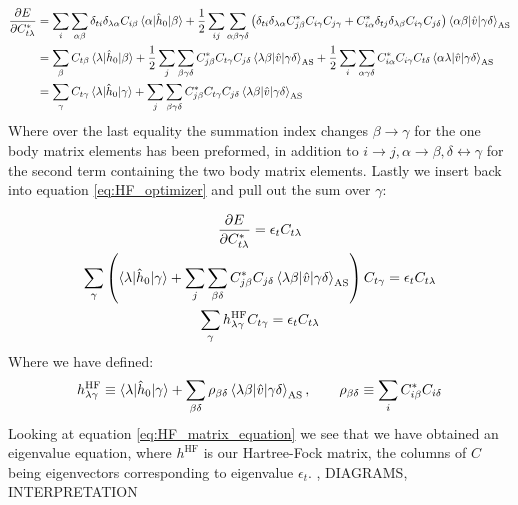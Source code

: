 \documentclass{article}
\newcommand{\inner}[3]{\braket{#1|#2|#3}}
\newcommand{\innerAS}[3]{\inner{#1}{#2}{#3}_{\text{AS}}}
\newcommand{\hnull}{\hat{h}_0}
\newcommand{\hafo}[1]{#1^{\text{HF}}}
\begin{document}
    \begin{align*}
        \pdv{E}{C^*_{t\lambda}} &= \sum_{i}\sum_{\alpha\beta} \delta_{ti}\delta_{\lambda\alpha} C_{i\beta} \inner{\alpha}{\hnull}{\beta} + \frac{1}{2}\sum_{ij}\sum_{\alpha\beta\gamma\delta} \left( \delta_{ti}\delta_{\lambda\alpha}C^*_{j\beta}C_{i\gamma}C_{j\gamma} + C^*_{i\alpha} \delta_{tj}\delta_{\lambda\beta} C_{i\gamma}C_{j\delta} \right) \innerAS{\alpha\beta}{\hat{v}}{\gamma\delta} \\
        &= \sum_{\beta} C_{t\beta} \inner{\lambda}{\hnull}{\beta} + \frac{1}{2}\sum_j \sum_{\beta\gamma\delta} C^*_{j\beta} C_{t\gamma} C_{j\delta} \innerAS{\lambda\beta}{\hat{v}}{\gamma\delta} + \frac{1}{2} \sum_i \sum_{\alpha\gamma\delta} C^*_{i\alpha} C_{i\gamma} C_{t\delta} \innerAS{\alpha\lambda}{\hat{v}}{\gamma\delta} \\
        &= \sum_\gamma C_{t\gamma} \inner{\lambda}{\hnull}{\gamma} + \sum_j \sum_{\beta\gamma\delta} C^*_{j\beta} C_{t\gamma} C_{j\delta} \innerAS{\lambda\beta}{\hat{v}}{\gamma\delta}
    \end{align*}
    Where over the last equality the summation index changes $\beta \rightarrow \gamma$ for the one body matrix elements has been preformed, in addition to $i \rightarrow j, \alpha \rightarrow \beta, \delta \leftrightarrow \gamma$ for the second term containing the two body matrix elements. Lastly we insert back into equation \eqref{eq:HF_optimizer} and pull out the sum over $\gamma$:

    \begin{gather}
        \pdv{E}{C^*_{t\lambda}} = \epsilon_t C_{t\lambda} \nonumber \\
        \sum_\gamma \left(\inner{\lambda}{\hnull}{\gamma} + \sum_j \sum_{\beta\delta} C^*_{j\beta} C_{j\delta} \innerAS{\lambda\beta}{\hat{v}}{\gamma\delta}\right)C_{t\gamma} = \epsilon_t C_{t\lambda} \nonumber\\
        \sum_{\gamma} \hafo{h_{\lambda\gamma}} C_{t\gamma} = \epsilon_t C_{t\lambda} \label{eq:HF_matrix_equation}
    \end{gather}
    Where we have defined:
    \begin{align}
        \hafo{h_{\lambda\gamma}} \equiv \inner{\lambda}{\hnull}{\gamma} + \sum_{\beta\delta} \rho_{\beta\delta} \innerAS{\lambda\beta}{\hat{v}}{\gamma\delta},\hspace{20px}\rho_{\beta \delta} \equiv \sum_i C^*_{i\beta} C_{i\delta} \label{eq:HF_matrix}
    \end{align}
    Looking at equation \eqref{eq:HF_matrix_equation} we see that we have obtained an eigenvalue equation, where $\hafo{h}$ is our Hartree-Fock matrix, the columns of $C$ being eigenvectors corresponding to eigenvalue $\epsilon_t$. , DIAGRAMS, INTERPRETATION
\end{document}
